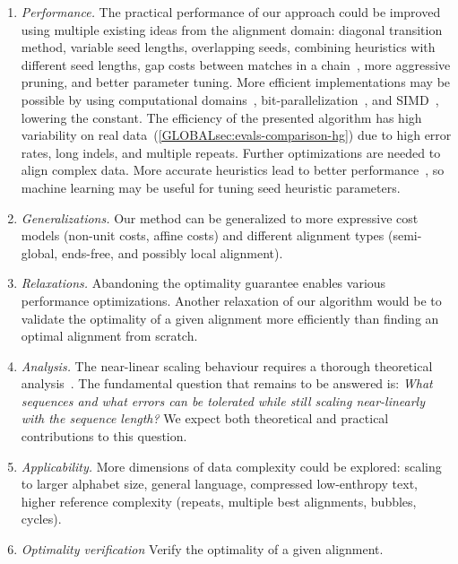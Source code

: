 \begin{enumerate}
    \item \emph{Performance.} The practical performance of our \A approach could
        be improved using multiple existing ideas from the alignment domain:
        diagonal transition method, variable seed lengths, overlapping seeds,
        combining heuristics with different seed lengths, gap costs between
        matches in a chain~\citep{ukkonen1985algorithms,wilbur1984context}, more
        aggressive pruning, and better parameter tuning. More efficient
        implementations may be possible by using computational
        domains~\citep{spouge1989speeding},
        bit-parallelization~\citep{myers1999fast}, and
        SIMD~\citep{marco2021fast}, lowering the \A constant. The efficiency of
        the presented algorithm has high variability on real
        data~(\cref{GLOBALsec:evals-comparison-hg}) due to high error rates,
        long indels, and multiple repeats. Further optimizations are needed to
        align complex data. More accurate heuristics lead to better \A
        performance~\cite{pearl_discovery_1983}, so machine learning may be
        useful for tuning seed heuristic parameters.
    \item \emph{Generalizations.} Our method can be generalized to more
        expressive cost models (non-unit costs, affine costs) and different alignment
        types (semi-global, ends-free, and possibly local alignment).
    \item \emph{Relaxations.} Abandoning the optimality guarantee
        enables various performance optimizations. Another relaxation
        of our algorithm would be to validate the optimality of a given alignment more
        efficiently than finding an optimal alignment from scratch.
    \item \emph{Analysis.} The near-linear scaling behaviour requires a thorough
        theoretical analysis~\citep{medvedev2022limitations}. The fundamental
        question that remains to be answered is: \emph{What sequences and what
        errors can be tolerated while still scaling near-linearly with the
        sequence length?} We expect both theoretical and practical contributions
        to this question.
    \item \emph{Applicability.} More dimensions of data complexity could be
        explored: scaling to larger alphabet size, general language, compressed
        low-enthropy text, higher reference complexity (repeats, multiple best
        alignments, bubbles, cycles).
    \item \emph{Optimality verification} Verify the optimality of a given alignment.
\end{enumerate}

